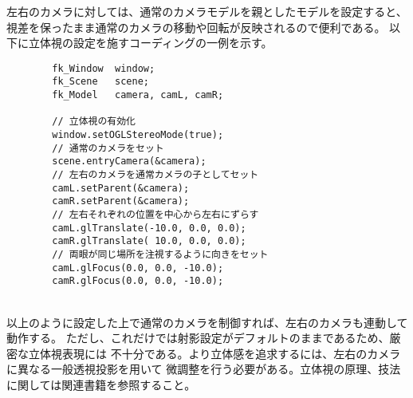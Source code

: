 左右のカメラに対しては、通常のカメラモデルを親としたモデルを設定すると、
視差を保ったまま通常のカメラの移動や回転が反映されるので便利である。
以下に立体視の設定を施すコーディングの一例を示す。
\\
\begin{breakbox}
\begin{verbatim}
        fk_Window  window;
        fk_Scene   scene;
        fk_Model   camera, camL, camR;

        // 立体視の有効化
        window.setOGLStereoMode(true);
        // 通常のカメラをセット
        scene.entryCamera(&camera);
        // 左右のカメラを通常カメラの子としてセット
        camL.setParent(&camera);
        camR.setParent(&camera);
        // 左右それぞれの位置を中心から左右にずらす
        camL.glTranslate(-10.0, 0.0, 0.0);
        camR.glTranslate( 10.0, 0.0, 0.0);
        // 両眼が同じ場所を注視するように向きをセット
        camL.glFocus(0.0, 0.0, -10.0);
        camR.glFocus(0.0, 0.0, -10.0);
\end{verbatim}
\end{breakbox}
~ \\
以上のように設定した上で通常のカメラを制御すれば、左右のカメラも連動して動作する。
ただし、これだけでは射影設定がデフォルトのままであるため、厳密な立体視表現には
不十分である。より立体感を追求するには、左右のカメラに異なる一般透視投影を用いて
微調整を行う必要がある。立体視の原理、技法に関しては関連書籍を参照すること。
\fi
